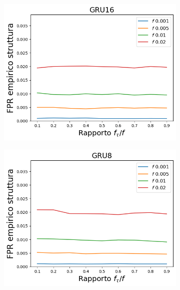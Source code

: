\documentclass[../../main.tex]{subfiles}
\begin{document}
    \begin{figure}[H]
        \centering
        \begin{subfigure}[b]{0.49\textwidth}
            \centering
            \includegraphics[width = \textwidth]{immagini/7/LBF/GRU16_FPR.png}
            \caption{}
            \label{fig:LBFFPR_GRU16}
        \end{subfigure}
        \begin{subfigure}[b]{0.49\textwidth}
            \centering
            \includegraphics[width = \textwidth]{immagini/7/LBF/GRU8_FPR.png}
            \caption{}
            \label{fig:LBFFPR_GRU8}
        \end{subfigure}

\end{figure}
\end{document}
